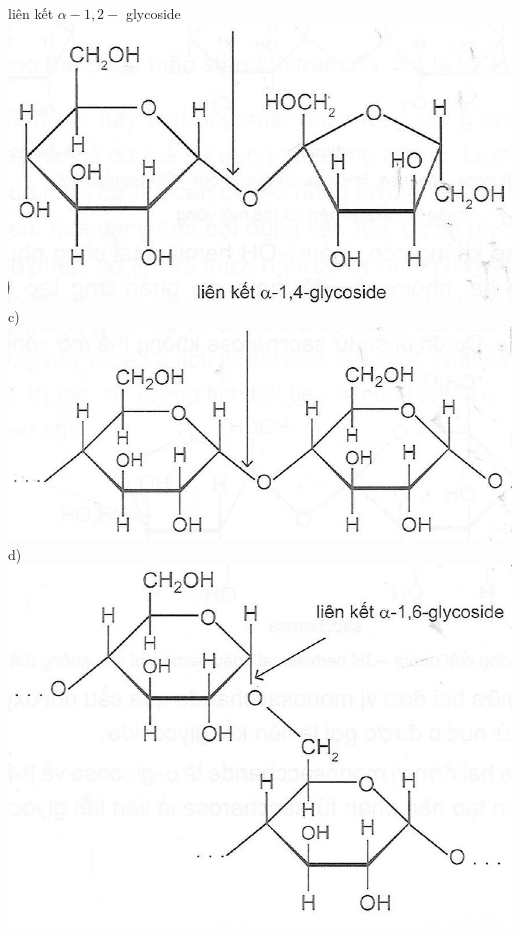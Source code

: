 \documentclass[10pt]{article}
\begin{document}
liên kết $\alpha-1,2-$ glycoside\\
\includegraphics[max width=\textwidth, center]{2025_10_23_b4e16b74380d0f7e7700g-039(2)}\\
c)\\
\includegraphics[max width=\textwidth, center]{2025_10_23_b4e16b74380d0f7e7700g-039}\\
d)\\
\includegraphics[max width=\textwidth, center]{2025_10_23_b4e16b74380d0f7e7700g-039(1)}
\end{document}
